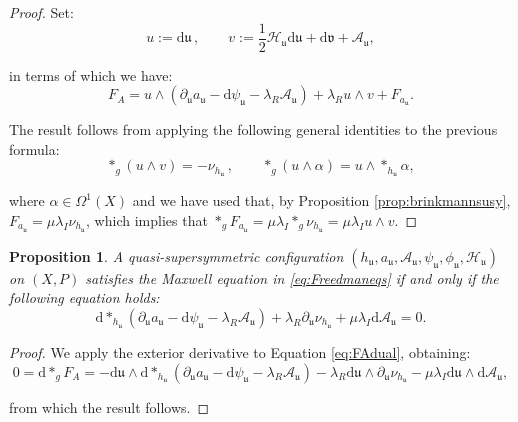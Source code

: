 \documentclass[10pt,a4paper,twoside,reqno]{amsart}
\theoremstyle{plain}
\newtheorem{prop}[thm]{Proposition}
\theoremstyle{definition}
\theoremstyle{remark}
\def\dd{\mathrm{d}}
\def\cH{\mathcal{H}}
\def\cA{\mathcal{A}}
\def\cH{\mathcal{H}}
\def\dd{\mathrm{d}}
\def\fru{\mathfrak{u}}
\def\frv{\mathfrak{v}}
\begin{document}
\begin{proof}
Set:
\begin{equation*}
u := \dd \fru \, , \qquad v:= \frac{1}{2}\cH_{\fru} \dd \fru + \dd \frv + \cA_{\fru},
\end{equation*}

\noindent
in terms of which we have:
\begin{equation*}
F_A = u\wedge (\partial_{\fru} a_{\fru} - \dd \psi_{\fru} - \lambda_R \cA_{\fru})   + \lambda_R u\wedge v + F_{a_{\fru}}.
\end{equation*}

\noindent
The result follows from applying the following general identities to the previous formula:
\begin{equation*}
\ast_g (u\wedge v) = - \nu_{h_{\fru}}\, , \qquad \ast_g (u \wedge \alpha) = u\wedge \ast_{h_{\fru}} \alpha,
\end{equation*}

\noindent
where $\alpha \in \Omega^1(X)$ and we have used that, by Proposition \ref{prop:brinkmannsusy}, $F_{a_{\fru}} = \mu\lambda_I \nu_{h_{\fru}}$, which implies that $\ast_g F_{a_{\fru}} = \mu\lambda_I \ast_g \nu_{h_{\fru}} = \mu\lambda_I u \wedge v$.
\end{proof}

\begin{prop}
\label{prop:susyYM}
A quasi-supersymmetric configuration $(h_{\fru}, a_{\fru}, \cA_{\fru}, \psi_{\fru}, \phi_{\fru}, \cH_{\fru})$ on $(X,P)$ satisfies the Maxwell equation in \eqref{eq:Freedmaneqs} if and only if the following equation holds:
\begin{equation*}
\dd \ast_{h_{\fru}} (\partial_{\fru} a_{\fru} - \dd \psi_{\fru} - \lambda_R  \cA_{\fru})  + \lambda_R   \partial_{\fru} \nu_{h_{\fru}} + \mu\lambda_I \dd \cA_{\fru} = 0.
\end{equation*} 
\end{prop}

\begin{proof}
We apply the exterior derivative to Equation \eqref{eq:FAdual}, obtaining:
\begin{equation*}
0 = \dd \ast_g F_A = - \dd \fru \wedge \dd \ast_{h_{\fru}} (\partial_{\fru} a_{\fru} - \dd \psi_{\fru} - \lambda_R  \cA_{\fru})  - \lambda_R \dd\fru \wedge \partial_{\fru} \nu_{h_{\fru}} - \mu\lambda_I \dd \fru \wedge \dd \cA_{\fru},
\end{equation*}

\noindent
from which the result follows.
\end{proof}
\end{document}
